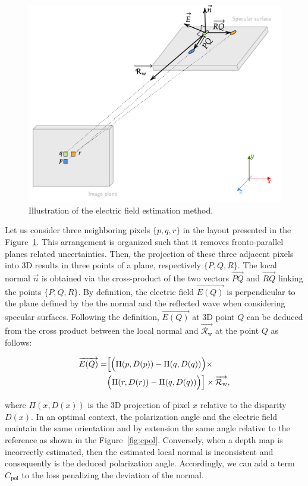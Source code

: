 \begin{figure}[]
	\centering
	\vspace{0.2cm}
	\includegraphics[keepaspectratio,width=.8\linewidth]{Figures/ECCV/foundation}
	\caption{Illustration of the electric field estimation method.}
	\label{fig:efromp}
\end{figure}

Let us consider three neighboring pixels $\{p, q, r\}$ in the layout presented in the Figure~\ref{fig:efromp}. This arrangement is organized such that it removes fronto-parallel planes related uncertainties. Then, the projection of these three adjacent pixels into 3D results in three points of a plane, respectively $\{ P, Q, R \}$. 
The local normal $\overrightarrow{n}$ is obtained via the cross-product of the two vectors $\overrightarrow{PQ}$ and $\overrightarrow{RQ}$ linking the points $\{P,Q,R\}$. By definition, the electric field $\overrightarrow{E(Q)}$ is perpendicular to the plane defined by the the normal and the reflected wave when considering specular surfaces. Following the definition, $\overrightarrow{E(Q)}$ at 3D point $Q$ can be deduced from the cross product between the local normal and $\overrightarrow{\mathcal{R}_\mathrm{w}}$ at the point $Q$ as follows:

\begin{equation}
\begin{split}
\overrightarrow{E(Q)} = &\Bigl[ \Big(\Pi(p,D(p)) - \Pi(q, D(q))\Big) \times\\& \Big(\Pi(r,D(r)) - \Pi(q, D(q))\Big) \Bigr]
\times \overrightarrow{\mathcal{R}_\mathrm{w}} ,
\end{split}
\end{equation}

where $\Pi(x,D(x))$ is the 3D projection of pixel $x$ relative to the disparity $D(x)$. In an optimal context, the polarization angle and the electric field maintain the same orientation and by extension the same angle relative to the reference as shown in the Figure~\ref{fig:cpol}. Conversely, when a depth map is incorrectly estimated, then the estimated local normal is inconsistent and consequently is the deduced polarization angle. Accordingly, we can add a term $C_{\textrm{pol}}$ to the loss penalizing the deviation of the normal.




